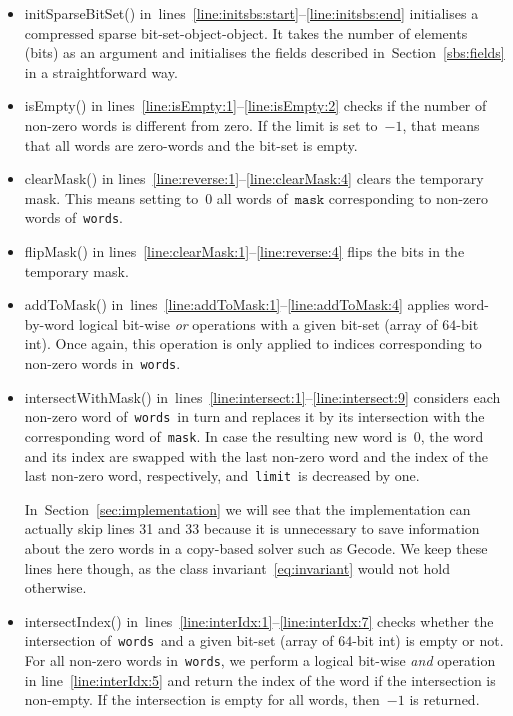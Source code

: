 \documentclass[a4paper,11pt]{article}
\newcommand{\Secref}[1]{Section~\ref{#1}}
\newcommand{\linesref}[2]{lines~\ref{#1}--\ref{#2}}
\newcommand{\Eqref}[1]{\eqref{#1}}
\newcommand{\Words}{\texttt{words}}
\newcommand{\Mask}{\texttt{mask}}
\newcommand{\Limit}{\texttt{limit}}
\newcommand{\bitset}[0]{compressed sparse bit-set}
\numberwithin{equation}{section}
\begin{document}
\begin{itemize}
  \item initSparseBitSet() in~\linesref{line:initsbs:start}{line:initsbs:end}
    initialises a \bitset-object-object. It takes 
    the number of elements (bits) as an argument and initialises the fields
    described in~\Secref{sbs:fields} in a straightforward way.

  \item isEmpty() in lines~\ref{line:isEmpty:1}--\ref{line:isEmpty:2} checks
    if the number of non-zero words is different from zero. If the limit is
    set to~$-1$, that means that all words are zero-words and the bit-set
    is empty.

  \item clearMask() in lines~\ref{line:reverse:1}--\ref{line:clearMask:4}
    clears the temporary mask. This means setting to~$0$ all words of~$\Mask$
    corresponding to non-zero words of~\Words.
    
  \item flipMask() in lines~\ref{line:clearMask:1}--\ref{line:reverse:4}
    flips the bits in the temporary mask.
  
  \item addToMask() in~\linesref{line:addToMask:1}{line:addToMask:4} applies
    word-by-word logical bit-wise
    \emph{or} operations with a given bit-set (array of $64$-bit int).
    Once again, this operation is only applied to indices corresponding to
    non-zero words in~\Words.

  \item intersectWithMask() in~\linesref{line:intersect:1}{line:intersect:9}
    considers each non-zero word of~\Words~in turn
    and replaces it by its intersection with the corresponding word of~\Mask.
    In case the resulting new word is~$0$, 
    the word and its index are swapped with the last non-zero word and
    the index of the last non-zero word, respectively, and~\Limit~is decreased
    by one.
        
    In~\Secref{sec:implementation} we will see that the implementation
    can actually skip lines 31 and 33 because it is unnecessary
    to save information about the zero words in a copy-based solver such 
    as Gecode.
    We keep these
    lines here though, as the class invariant~\Eqref{eq:invariant} 
    would not hold otherwise.
    
  \item intersectIndex() in~\linesref{line:interIdx:1}{line:interIdx:7}
    checks whether the intersection of~\Words~and a given bit-set
    (array of $64$-bit int) is empty or not. For all non-zero words in~\Words,
    we perform a logical bit-wise \emph{and} operation 
    in line~\ref{line:interIdx:5} and return
    the index of the word if the intersection is non-empty. If the
    intersection is empty for all words, then~$-1$ is returned.
\end{itemize}
\end{document}
